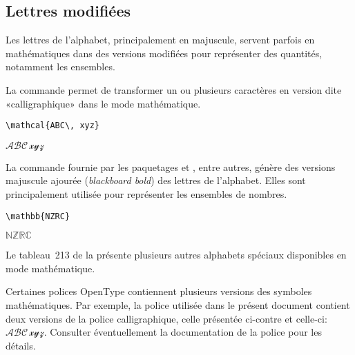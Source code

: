 \subsection{Lettres modifiées}
\label{sec:math:symboles:mathcal}

Les lettres de l'alphabet, principalement en majuscule, servent
parfois en mathématiques dans des versions modifiées pour représenter
des quantités, notamment les ensembles.

La commande \cmd{\mathcal} permet de transformer un ou plusieurs
caractères en version dite «calligraphique» dans le mode mathématique.
\begin{demo}
  \begin{texample}
\begin{lstlisting}
\mathcal{ABC\, xyz}
\end{lstlisting}
    \producing
    $\mathscr{ABC\, xyz}$
  \end{texample}
\end{demo}

La commande \cmd{\mathbb} fournie par les paquetages  et
, entre autres, génère des versions majuscule
ajourée (\emph{blackboard bold}) des lettres de l'alphabet. Elles sont
principalement utilisée pour représenter les ensembles de nombres.
\begin{demo}
  \begin{texample}
\begin{lstlisting}
\mathbb{NZRC}
\end{lstlisting}
    \producing $\mathbb{NZRC}$
  \end{texample}
\end{demo}

Le tableau~213 de la %
présente plusieurs autres alphabets spéciaux disponibles en mode
mathématique.

\begin{conseil}
  Certaines polices OpenType contiennent plusieurs
  versions des symboles mathématiques. Par exemple, la police utilisée
  dans le présent document contient deux versions de la police
  calligraphique, celle présentée ci-contre et celle-ci: %
  $\mathscr{ABC\, xyz}$. Consulter éventuellement la documentation de
  la police pour les détails.
\end{conseil}

